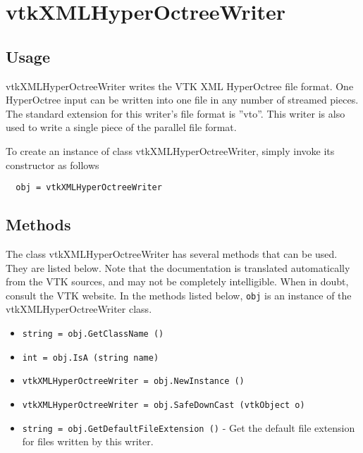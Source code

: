 \section{vtkXMLHyperOctreeWriter}

\subsection{Usage}

 vtkXMLHyperOctreeWriter writes the VTK XML HyperOctree file
 format.  One HyperOctree input can be written into one file in
 any number of streamed pieces.  The standard extension for this
 writer's file format is ''vto''.  This writer is also used to write a
 single piece of the parallel file format.

To create an instance of class vtkXMLHyperOctreeWriter, simply
invoke its constructor as follows
\begin{verbatim}
  obj = vtkXMLHyperOctreeWriter
\end{verbatim}
\subsection{Methods}

The class vtkXMLHyperOctreeWriter has several methods that can be used.
  They are listed below.
Note that the documentation is translated automatically from the VTK sources,
and may not be completely intelligible.  When in doubt, consult the VTK website.
In the methods listed below, \verb|obj| is an instance of the vtkXMLHyperOctreeWriter class.
\begin{itemize}
\item  \verb|string = obj.GetClassName ()|

\item  \verb|int = obj.IsA (string name)|

\item  \verb|vtkXMLHyperOctreeWriter = obj.NewInstance ()|

\item  \verb|vtkXMLHyperOctreeWriter = obj.SafeDownCast (vtkObject o)|

\item  \verb|string = obj.GetDefaultFileExtension ()| -  Get the default file extension for files written by this writer.

\end{itemize}
